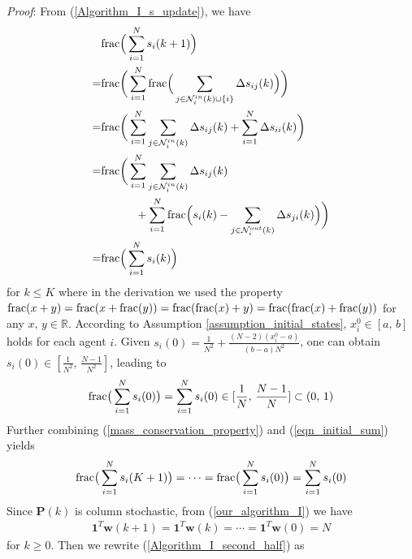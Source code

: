 \documentclass{IEEEtran}
\begin{document}
{\it Proof}: From (\ref{Algorithm_I_s_update}), we have
\begin{equation}\label{mass_conservation_property}
	\begin{aligned}
		& {\rm frac}\Big(\sum_{i=1}^{N}s_i(k+1)\Big)\\ 
		= & {\rm frac}\bigg(\sum_{i=1}^{N} {\rm frac}\Big(\sum_{j \in \mathcal{N}_i^{in}(k)\cup \{i\}} \Delta s_{ij}(k) \Big)\bigg)\\
		= & {\rm frac}\bigg(\sum_{i=1}^{N} \sum_{j \in \mathcal{N}_i^{in}(k)} \Delta s_{ij}(k) + \sum_{i=1}^{N} \Delta s_{ii}(k) \bigg)\\
		= & {\rm frac}\bigg(\sum_{i=1}^{N} \sum_{j \in \mathcal{N}_i^{in}(k)} \Delta s_{ij}(k) \\
		& \qquad \quad + \sum_{i=1}^{N} {\rm frac}\Big(s_i(k)-\sum_{j\in \mathcal{N}_i^{out}(k)}\Delta s_{ji}(k)\Big) \bigg)\\
		= & {\rm frac}\Big(\sum_{i=1}^{N}s_i(k)\Big)
	\end{aligned}
\end{equation}
for $k \leq K$ where in the derivation we used the property ${\rm frac}(x+y) = {\rm frac}(x+{\rm frac}(y)) = {\rm frac}({\rm frac}(x)+y) = {\rm frac}({\rm frac}(x)+{\rm frac}(y))$ for any $x, \, y \in \mathbb{R}$. According to Assumption \ref{assumption_initial_states}, $x_i^0 \in [a, \, b]$ holds for each agent $i$. Given $s_i(0)= \frac{1}{N^2} + \frac{(N-2)(x_i^0-a)}{(b-a)N^2}$, one can obtain $s_i(0)\in [\frac{1}{N^2}, \, \frac{N-1}{N^2}]$, leading to
\begin{equation}\label{eqn_initial_sum}
	{\rm frac}\big(\sum_{i=1}^{N}s_i(0)\big) = \sum_{i=1}^{N}s_i(0) \in [\frac{1}{N}, \, \frac{N-1}{N}] \subset (0, \, 1)
\end{equation}
Further combining (\ref{mass_conservation_property}) and (\ref{eqn_initial_sum}) yields
\begin{equation}\label{eqn_state_sum}
	{\rm frac}\big(\sum_{i=1}^{N}s_i(K+1)\big) = \cdots = {\rm frac}\big(\sum_{i=1}^{N}s_i(0)\big) = \sum_{i=1}^{N}s_i(0)
\end{equation}
Since $\mathbf{P}(k)$ is column stochastic, from (\ref{our_algorithm_I}) we have
\begin{equation}\label{mass_conservation_w}
	\begin{aligned}
		\mathbf{1}^T \mathbf{w}(k+1) = \mathbf{1}^T \mathbf{w}(k) = \cdots =\mathbf{1}^T \mathbf{w}(0) = N
	\end{aligned}
\end{equation}
for $k \geq 0$. Then we rewrite (\ref{Algorithm_I_second_half}) as
\end{document}
